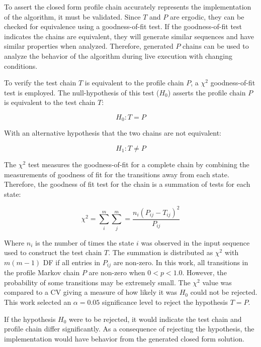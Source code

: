 To assert the closed form profile chain accurately represents the implementation of the algorithm, it must be validated.
Since $T$ and $P$ are ergodic, they can be checked for equivalence using a goodness-of-fit test.
If the goodness-of-fit test indicates the chains are equivalent, they will generate similar sequences and have similar properties when analyzed.
Therefore, generated $P$ chains can be used to analyze the behavior of the algorithm during live execution with changing conditions.

To verify the test chain $T$ is equivalent to the profile chain $P$, a $\chi^2$ goodness-of-fit test is employed.
The null-hypothesis of this test ($H_{0}$) asserts the profile chain $P$ is equivalent to the test chain $T$:

\begin{equation} H_{0}: T = P \end{equation}

With an alternative hypothesis that the two chains are not equivalent:

\begin{equation} H_{1}: T \neq P \end{equation}

The $\chi^2$ test measures the goodness-of-fit for a complete chain by combining the measurements of goodness of fit for the transitions away from each state.
Therefore, the goodness of fit test for the chain is a summation of tests for each state:\cite{MARKOV3}

\begin{equation} \chi^2 = \sum_{i}^{m} \sum_{j}^{m} = \frac{n_{i}(P_{ij}-T_{ij})^2}{P_{ij}} \end{equation}

Where $n_{i}$ is the number of times the state $i$ was observed in the input sequence used to construct the test chain $T$.
The summation is distributed as $\chi^2$ with $m(m-1)$ \ac{DF} if all entries in $P_{ij}$ are non-zero.
In this work, all transitions in the profile Markov chain $P$ are non-zero when $0<p<1.0$.
However, the probability of some transitions may be extremely small.
The $\chi^2$ value was compared to a \ac{CV} giving a measure of how likely it was $H_{0}$ could not be rejected.
This work selected an $\alpha = 0.05$ significance level to reject the hypothesis $T=P$.

If the hypothesis $H_{0}$ were to be rejected, it would indicate the test chain and profile chain differ significantly.
As a consequence of rejecting the hypothesis, the implementation would have behavior from the generated closed form solution.

